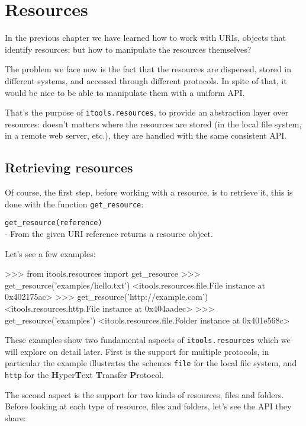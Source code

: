 \chapter{Resources}

In the previous chapter we have learned how to work with URIs, objects that
identify resources; but how to manipulate the resources themselves?

The problem we face now is the fact that the resources are dispersed, stored
in different systems, and accessed through different protocols. In spite of
that, it would be nice to be able to manipulate them with a uniform API.

That's the purpose of {\tt itools.resources}, to provide an abstraction layer
over resources: doesn't matters where the resources are stored (in the local
file system, in a remote web server, etc.), they are handled with the same
consistent API.

\section{Retrieving resources}

Of course, the first step, before working with a resource, is to retrieve it,
this is done with the function {\tt get\_resource}:

\begin{api}
  {\tt get\_resource(reference)}\\
  - From the given URI reference returns a resource object.
\end{api}

Let's see a few examples:

\begin{code}
    >>> from itools.resources import get_resource
    >>> get_resource('examples/hello.txt')
    <itools.resources.file.File instance at 0x402175ac>
    >>> get_resource('http://example.com')
    <itools.resources.http.File instance at 0x404aadec>
    >>> get_resource('examples')
    <itools.resources.file.Folder instance at 0x401e568c>
\end{code}

These examples show two fundamental aspects of {\tt itools.resources} which
we will explore on detail later. First is the support for multiple protocols,
in particular the example illustrates the schemes {\tt file} for the local
file system, and {\tt http} for the {\bf H}yper{\bf T}ext {\bf T}ransfer
{\bf P}rotocol.

The second aspect is the support for two kinds of resources, files and folders.
Before looking at each type of resource, files and folders, let's see the API
they share:

